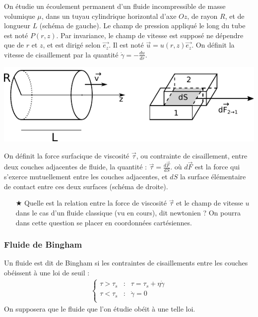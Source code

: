 \documentclass{report}
\begin{document}
On étudie un écoulement permanent d'un fluide incompressible de masse volumique $\mu$, dans un tuyau cylindrique horizontal d'axe $Oz$, de rayon $R$, et de longueur $L$ (schéma de gauche). Le champ de pression appliqué le long du tube est noté $P(r,z)$. Par invariance, le champ de vitesse est supposé ne dépendre que de $r$ et $z$, et est dirigé selon $\vec{e_z}$. Il est noté $\vec{u}=u(r,z)\vec{e_z}$. On définit la vitesse de cisaillement par la quantité $\dot{\gamma}=-\frac{du}{dr}$. 

\begin{center}
	\includegraphics[scale=0.8]{meca_flu2.pdf}
\end{center}

On définit la force surfacique de viscosité $\vec{\tau}$, ou contrainte de cisaillement, entre deux couches adjacentes de fluide, la quantité : $\vec{\tau}=\frac{d\vec{F}}{dS}$.
où $d\vec{F}$ est la force qui s'exerce mutuellement entre les couches adjacentes, et $dS$ la surface élémentaire de contact entre ces deux surfaces (schéma de droite).

\begin{itemize}
	\item[$\bigstar$] Quelle est la relation entre la force de viscosité $\vec{\tau}$ et le champ de vitesse $u$ dans le cas d'un fluide classique (vu en cours), dit newtonien ? On pourra dans cette question se placer en coordonnées cartésiennes.
	
\end{itemize}

\subsubsection*{Fluide de Bingham}

Un fluide est dit de Bingham si les contraintes de cisaillements entre les couches obéissent à une loi de seuil : 
\begin{align*}
	\left\lbrace
\begin{array}{ccc}
\tau>\tau_s & : & \tau = \tau_s+\eta\dot{\gamma} \\
\tau<\tau_s & : & \dot{\gamma}=0\\
\end{array}\right.
\end{align*}
On supposera que le fluide que l'on étudie obéit à une telle loi. 
\end{document}
